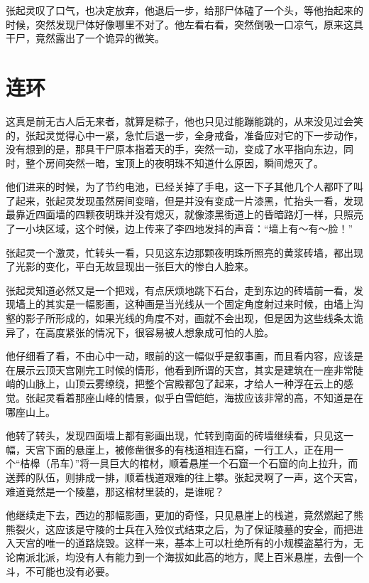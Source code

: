 张起灵叹了口气，也决定放弃，他退后一步，给那尸体磕了一个头，等他抬起来的时候，突然发现尸体好像哪里不对了。他左看右看，突然倒吸一口凉气，原来这具干尸，竟然露出了一个诡异的微笑。

\chapter{连环}

这真是前无古人后无来者，就算是粽子，他也只见过能蹦能跳的，从来没见过会笑的，张起灵觉得心中一紧，急忙后退一步，全身戒备，准备应对它的下一步动作，没有想到的是，那具干尸原本指着天的手，突然一动，变成了水平指向东边，同时，整个房间突然一暗，宝顶上的夜明珠不知道什么原因，瞬间熄灭了。

他们进来的时候，为了节约电池，已经关掉了手电，这一下子其他几个人都吓了叫了起来，张起灵发现虽然房间变暗，但是并没有变成一片漆黑，忙抬头一看，发现最靠近四面墙的四颗夜明珠并没有熄灭，就像漆黑街道上的昏暗路灯一样，只照亮了一小块区域，这个时候，边上传来了李四地发抖的声音：“墙上有～有～脸！”

张起灵一个激灵，忙转头一看，只见这东边那颗夜明珠所照亮的黄浆砖墙，都出现了光影的变化，平白无故显现出一张巨大的惨白人脸来。

张起灵知道必然又是一个把戏，有点厌烦地跳下石台，走到东边的砖墙前一看，发现墙上的其实是一幅影画，这种画是当光线从一个固定角度射过来时候，由墙上沟壑的影子所形成的，如果光线的角度不对，画就不会出现，但是因为这些线条太诡异了，在高度紧张的情况下，很容易被人想象成可怕的人脸。

他仔细看了看，不由心中一动，眼前的这一幅似乎是叙事画，而且看内容，应该是在展示云顶天宫刚完工时候的情形，他看到所谓的天宫，其实是建筑在一座非常陡峭的山脉上，山顶云雾缭绕，把整个宫殿都包了起来，才给人一种浮在云上的感觉。张起灵看着那座山峰的情景，似乎白雪皑皑，海拔应该非常的高，不知道是在哪座山上。

他转了转头，发现四面墙上都有影画出现，忙转到南面的砖墙继续看，只见这一幅，天宫下面的悬崖上，被修凿很多的有栈道相连石窟，一行工人，正在用一个“桔槔（吊车）”将一具巨大的棺材，顺着悬崖一个石窟一个石窟的向上拉升，而送葬的队伍，则排成一排，顺着栈道艰难的往上攀。张起灵啊了一声，这个天宫，难道竟然是一个陵墓，那这棺材里装的，是谁呢？

他继续走下去，西边的那幅影画，更加的奇怪，只见悬崖上的栈道，竟然燃起了熊熊裂火，这应该是守陵的士兵在入殓仪式结束之后，为了保证陵墓的安全，而把进入天宫的唯一的道路烧毁。这样一来，基本上可以杜绝所有的小规模盗墓行为，无论南派北派，均没有人有能力到一个海拔如此高的地方，爬上百米悬崖，去倒一个斗，不可能也没有必要。

